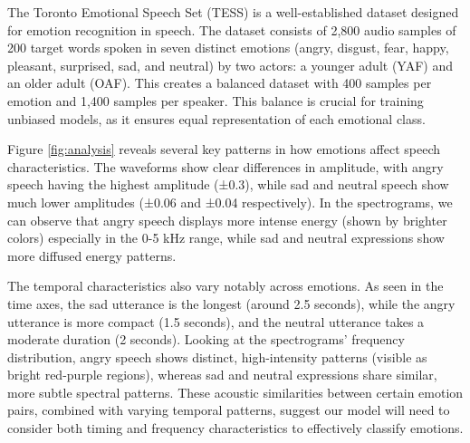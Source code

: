 \documentclass[../main.tex]{subfiles}
\begin{document}
The Toronto Emotional Speech Set (TESS) is a well-established dataset 
designed for emotion recognition in speech. The dataset consists of 2,800 
audio samples of 200 target words spoken in seven distinct emotions 
(angry, disgust, fear, happy, pleasant, surprised, sad, and neutral) 
by two actors: a younger adult (YAF) and an older adult (OAF). 
This creates a balanced dataset with 400 samples per emotion and 1,400 
samples per speaker. This balance is crucial for training unbiased models, 
as it ensures equal representation of each emotional class.


Figure \ref{fig:analysis} reveals several key patterns in how emotions affect 
speech characteristics. The waveforms show clear differences in amplitude, with 
angry speech having the highest amplitude (±0.3), while sad and neutral speech 
show much lower amplitudes (±0.06 and ±0.04 respectively). In the spectrograms, 
we can observe that angry speech displays more intense energy 
(shown by brighter colors) especially in the 0-5 kHz range, while sad and 
neutral expressions show more diffused energy patterns.

The temporal characteristics also vary notably across emotions. As seen in the 
time axes, the sad utterance is the longest (around 2.5 seconds), while the 
angry utterance is more compact (1.5 seconds), and the neutral utterance takes 
a moderate duration (2 seconds). Looking at the spectrograms' frequency 
distribution, angry speech shows distinct, high-intensity patterns 
(visible as bright red-purple regions), whereas sad and neutral expressions 
share similar, more subtle spectral patterns. These acoustic similarities 
between certain emotion pairs, combined with varying temporal patterns, 
suggest our model will need to consider both timing and frequency 
characteristics to effectively classify emotions.
\end{document}
